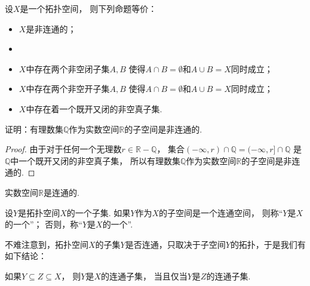 \begin{theorem}
设\(X\)是一个拓扑空间，
则下列命题等价：\begin{itemize}
	\item \(X\)是非连通的；
	\item
	\item \(X\)中存在两个非空闭子集\(A,B\)
	使得\(A \cap B = \emptyset\)和\(A \cup B = X\)同时成立；

	\item \(X\)中存在两个非空开子集\(A,B\)
	使得\(A \cap B = \emptyset\)和\(A \cup B = X\)同时成立；

	\item \(X\)中存在着一个既开又闭的非空真子集.
\end{itemize}
\end{theorem}

\begin{example}
证明：有理数集\(\mathbb{Q}\)作为实数空间\(\mathbb{R}\)的子空间是非连通的.
\begin{proof}
由于对于任何一个无理数\(r \in \mathbb{R}-\mathbb{Q}\)，
集合\((-\infty,r)\cap\mathbb{Q}
= (-\infty,r]\cap\mathbb{Q}\)
是\(\mathbb{Q}\)中一个既开又闭的非空真子集，
所以有理数集\(\mathbb{Q}\)作为实数空间\(\mathbb{R}\)的子空间是非连通的.
\end{proof}
\end{example}

\begin{theorem}
实数空间\(\mathbb{R}\)是连通的.
\end{theorem}

\begin{definition}
设\(Y\)是拓扑空间\(X\)的一个子集.
如果\(Y\)作为\(X\)的子空间是一个连通空间，
则称“\(Y\)是\(X\)的一个”；
否则，称“\(Y\)是\(X\)的一个”.
\end{definition}

不难注意到，拓扑空间\(X\)的子集\(Y\)是否连通，只取决于子空间\(Y\)的拓扑，于是我们有如下结论：
\begin{proposition}
如果\(Y \subseteq Z \subseteq X\)，
则\(Y\)是\(X\)的连通子集，
当且仅当\(Y\)是\(Z\)的连通子集.
\end{proposition}

